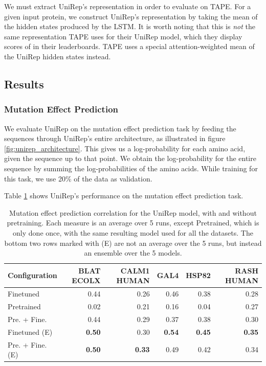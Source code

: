 We must extract UniRep's representation in order to evaluate on TAPE. For a given input protein, we construct UniRep's representation by taking the mean of the hidden states produced by the LSTM. It is worth noting that this is \textit{not} the same representation TAPE uses for their UniRep model, which they display scores of in their leaderboards. TAPE uses a special attention-weighted mean of the UniRep hidden states instead.

\subsection{Results}
\subsubsection{Mutation Effect Prediction}
We evaluate UniRep on the mutation effect prediction task by feeding the sequences through UniRep's entire architecture, as illustrated in figure \ref{fig:unirep_architecture}. This gives us a log-probability for each amino acid, given the sequence up to that point. We obtain the log-probability for the entire sequence by summing the log-probabilities of the amino acids. While training for this task, we use 20\% of the data as validation.%

Table \ref{tab:unirep_mutation_results} shows UniRep's performance on the mutation effect prediction task.

\begin{table}[ht]
    \centering
    \begin{tabularx}{\textwidth}{lrrrrr}
    \hline
    \textbf{Configuration} & \textbf{BLAT ECOLX} & \textbf{CALM1 HUMAN} & \textbf{GAL4}   & \textbf{HSP82}  & \textbf{RASH HUMAN} \\ \hline
    Finetuned              & 0.44                & 0.26                 & 0.46            & 0.38            & 0.28 \\
    Pretrained             & 0.02                & 0.21                 & 0.16            & 0.04            & 0.27 \\
    Pre. + Fine.           & 0.44                & 0.29                 & 0.37            & 0.38            & 0.30 \\ \hline
    Finetuned (E)          & \textbf{0.50}       & 0.30                 & \textbf{0.54}   & \textbf{0.45}   & \textbf{0.35} \\
    Pre. + Fine. (E)       & \textbf{0.50}       & \textbf{0.33}        & 0.49            & 0.42            & 0.34 \\
    \hline
    \end{tabularx}
    \caption{Mutation effect prediction correlation for the UniRep model, with and without pretraining. Each measure is an average over 5 runs, except Pretrained, which is only done once, with the same resulting model used for all the datasets. The bottom two rows marked with (E) are not an average over the 5 runs, but instead an ensemble over the 5 models.}
    \label{tab:unirep_mutation_results}
\end{table}

